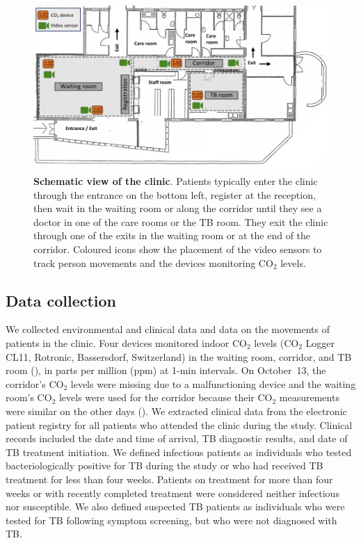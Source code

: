\documentclass[fleqn,11pt]{wlscirep}
\begin{document}
\begin{figure}[!htpb]
    \centering
    \includegraphics{doc/clinic-schematic-annotated-view.pdf}
    \caption{\textbf{Schematic view of the clinic}. Patients typically enter the clinic through the entrance on the bottom left, register at the reception, then wait in the waiting room or along the corridor until they see a doctor in one of the care rooms or the TB room. They exit the clinic through one of the exits in the waiting room or at the end of the corridor. Coloured icons show the placement of the video sensors to track person movements and the devices monitoring CO$_2$ levels.}
    \label{fig:floor-plan}
\end{figure}


\subsection*{Data collection}

We collected environmental and clinical data and data on the movements of patients in the clinic. Four devices monitored indoor CO$_2$ levels (CO$_2$ Logger CL11, Rotronic, Bassersdorf, Switzerland) in the waiting room, corridor, and TB room (), in parts per million (ppm) at 1-min intervals. On October~13, the corridor's CO$_2$ levels were missing due to a malfunctioning device and the waiting room's CO$_2$ levels were used for the corridor because their CO$_2$ measurements were similar on the other days ().    
We extracted clinical data from the electronic patient registry for all patients who attended the clinic during the study. Clinical records included the date and time of arrival, TB diagnostic results, and date of TB treatment initiation. We defined infectious patients as individuals who tested bacteriologically positive for TB during the study or who had received TB treatment for less than four weeks. Patients on treatment for more than four weeks or with recently completed treatment were considered neither infectious nor susceptible. We also defined suspected TB patients as individuals who were tested for TB following symptom screening, but who were not diagnosed with TB. 
\end{document}
